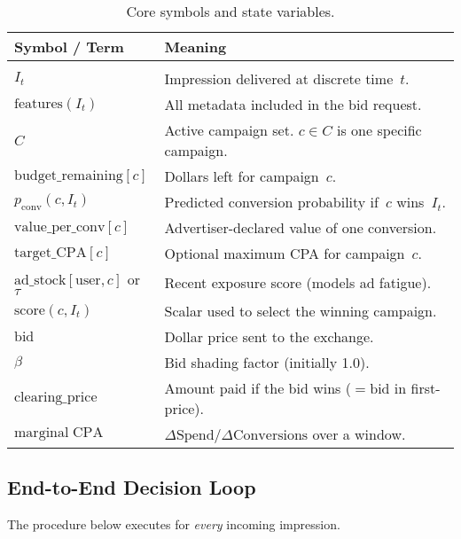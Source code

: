 \documentclass[11pt]{article}
\begin{document}
\begin{table}[H]
  \centering
  \caption{Core symbols and state variables.}
  \label{tab:variables}
  \begin{tabular}{ll}
    \hline
    Symbol / Term & Meaning \\
    \hline \\ 
    $I_t$ & Impression delivered at discrete time~$t$. \\
    $\mathrm{features}(I_t)$ & All metadata included in the bid request. \\
    $C$ & Active campaign set. $c \in C$ is one specific campaign. \\
    $\mathrm{budget\_remaining}[c]$ & Dollars left for campaign~$c$. \\
    $p_{\mathrm{conv}}(c,I_t)$ & Predicted conversion probability
    if~$c$ wins~$I_t$. \\
    $\mathrm{value\_per\_conv}[c]$ & Advertiser-declared value of one
    conversion. \\
    $\mathrm{target\_CPA}[c]$ & Optional maximum CPA for campaign~$c$. \\
    $\mathrm{ad\_stock}[\text{user},c]$ or $\tau$ & Recent exposure score
    (models ad fatigue). \\
    $\mathrm{score}(c,I_t)$ & Scalar used to select the winning campaign. \\
    $\mathrm{bid}$ & Dollar price sent to the exchange. \\
    $\beta$ & Bid shading factor (initially 1.0). \\
    $\mathrm{clearing\_price}$ & Amount paid if the bid wins
    ($=\mathrm{bid}$ in first-price). \\
    $\mathrm{marginal\;CPA}$ & $\Delta\text{Spend} /
    \Delta\text{Conversions}$ over a window.\\ 
  \end{tabular}
\end{table}

\subsection{End-to-End Decision Loop}\label{sec:decisionloop}
The procedure below executes for \emph{every} incoming impression.
\end{document}
